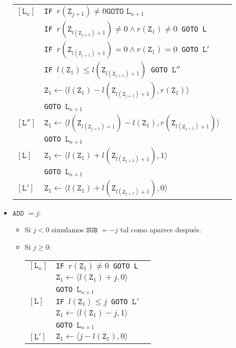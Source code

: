\documentclass[twoside]{article}
\begin{document}
\begin{itemize}
\begin{tabular}{l l l}
$[\texttt{L}_\kappa]$&\texttt{IF }$r(\texttt{Z}_{j+1})\neq 0\texttt{GOTO }\texttt{L}_{n+1}$&\\
&\texttt{IF }$r(\texttt{Z}_{l(\texttt{Z}_{j+1})+1})\neq 0\land r(\texttt{Z}_{1})\neq 0$\texttt{ GOTO L}&\\
&\texttt{IF }$r(\texttt{Z}_{l(\texttt{Z}_{j+1})+1})= 0\land r(\texttt{Z}_1)= 0$\texttt{ GOTO }$\texttt{L}'$&\\
&\texttt{IF }$l(\texttt{Z}_1)\leq l(\texttt{Z}_{l(\texttt{Z}_{j+1})+1})$\texttt{ GOTO }$\texttt{L}''$&\\
& $\texttt{Z}_1\leftarrow \langle l(\texttt{Z}_1)-l(\texttt{Z}_{l(\texttt{Z}_{j+1})+1}),r(\texttt{Z}_{1})\rangle$&\\
& \texttt{GOTO }$\texttt{L}_{\kappa+1}$& \\
$[\texttt{L}'']$& $\texttt{Z}_1\leftarrow \langle l(\texttt{Z}_{l(\texttt{Z}_{j+1})+1})-l(\texttt{Z}_1),r(\texttt{Z}_{l(\texttt{Z}_{j+1})+1})\rangle$&\\
& \texttt{GOTO }$\texttt{L}_{\kappa+1}$& \\
$[\texttt{L}]$& $\texttt{Z}_1\leftarrow \langle l(\texttt{Z}_{1})+l(\texttt{Z}_{l(\texttt{Z}_{j+1})+1}),1\rangle$&\\
& \texttt{GOTO }$\texttt{L}_{\kappa+1}$& \\
$[\texttt{L}']$& $\texttt{Z}_1\leftarrow \langle l(\texttt{Z}_{1})+l(\texttt{Z}_{l(\texttt{Z}_{j+1})+1}),0\rangle$&
\end{tabular}



\item $\texttt{ADD }=j$:
\begin{itemize}
\item Si $j<0$ simulamos $\texttt{SUB }=-j$ tal como aparece después.

\item Si $j\geq 0$:

\begin{tabular}{l l l}
$[\texttt{L}_\kappa]$&\texttt{IF }$r(\texttt{Z}_1)\neq 0$\texttt{ GOTO L}\\
&$\texttt{Z}_1\leftarrow \langle  l(\texttt{Z}_1)+j,0\rangle$\\
&\texttt{GOTO }$\texttt{L}_{\kappa+1}$& \\
$[\texttt{L}]$&\texttt{IF }$l(\texttt{Z}_1)\leq j$\texttt{ GOTO }$\texttt{L}'$&\\
&$\texttt{Z}_1\leftarrow \langle l(\texttt{Z}_1)-j,1\rangle$\\


&\texttt{GOTO }$\texttt{L}_{\kappa+1}$& \\
$[\texttt{L}']$&$\texttt{Z}_1\leftarrow \langle j-l(\texttt{Z}_1),0\rangle$
\end{tabular}
\end{itemize}
\end{itemize}
\end{document}
